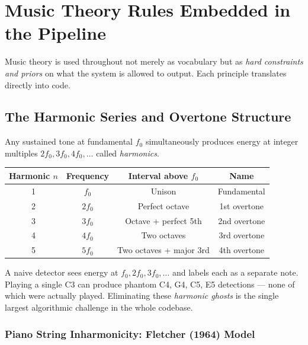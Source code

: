 \documentclass[12pt, a4paper]{article}
\begin{document}
\section{Music Theory Rules Embedded in the Pipeline}

Music theory is used throughout not merely as vocabulary but as
\emph{hard constraints and priors} on what the system is allowed to output.
Each principle translates directly into code.

\subsection{The Harmonic Series and Overtone Structure}

Any sustained tone at fundamental $f_0$ simultaneously produces energy at
integer multiples $2f_0, 3f_0, 4f_0,\ldots$ called \emph{harmonics}.

\begin{center}
\begin{tabular}{cccc}
  \toprule
  Harmonic $n$ & Frequency & Interval above $f_0$ & Name \\
  \midrule
  1 & $f_0$   & Unison                    & Fundamental   \\
  2 & $2f_0$  & Perfect octave            & 1st overtone  \\
  3 & $3f_0$  & Octave + perfect 5th      & 2nd overtone  \\
  4 & $4f_0$  & Two octaves               & 3rd overtone  \\
  5 & $5f_0$  & Two octaves + major 3rd   & 4th overtone  \\
  \bottomrule
\end{tabular}
\end{center}

\begin{warnbox}
  A naive detector sees energy at $f_0, 2f_0, 3f_0,\ldots$ and labels each
  as a separate note. Playing a single C3 can produce phantom C4, G4, C5,
  E5 detections --- none of which were actually played. Eliminating these
  \emph{harmonic ghosts} is the single largest algorithmic challenge in the
  whole codebase.
\end{warnbox}

\subsubsection{Piano String Inharmonicity: Fletcher (1964) Model}
\end{document}
